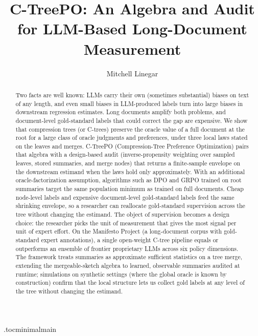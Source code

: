 \documentclass[11pt]{article}
\title{C-TreePO: An Algebra and Audit for LLM-Based Long-Document Measurement}
\author{Mitchell Linegar}
\date{}
\begin{document}
\maketitle

\begin{abstract}
Two facts are well known: LLMs carry their own (sometimes substantial)
biases on text of any length, and even small biases in LLM-produced
labels turn into large biases in downstream regression estimates. Long
documents amplify both problems, and document-level gold-standard
labels that could correct the gap are expensive. We show that compression trees (or C-trees) preserve the oracle value
of a full document at the root for a large class of oracle judgments
and preferences, under three local laws stated on the leaves and
merges. C-TreePO (Compression-Tree Preference Optimization) pairs that
algebra with a design-based audit
(inverse-propensity weighting over sampled leaves, stored summaries,
and merge nodes) that returns a finite-sample envelope on the
downstream estimand when the laws hold only approximately. With an
additional oracle-factorization assumption, algorithms such as DPO and
GRPO trained on root summaries target the same population minimum as
trained on full documents. Cheap node-level labels and expensive document-level
gold-standard labels feed the same shrinking envelope, so a
researcher can reallocate gold-standard supervision across the tree
without changing the estimand. The object of supervision becomes a design choice: the
researcher picks the unit of measurement that gives the most signal
per unit of expert effort. On the Manifesto Project (a long-document corpus with
gold-standard expert annotations), a single open-weight C-tree pipeline
equals or outperforms an ensemble of frontier proprietary LLMs
\citep{BenoitEtAl2025} across six policy dimensions. The framework treats summaries as approximate
sufficient statistics on a tree merge, extending the mergeable-sketch
algebra \citep{Agarwal2013MergeableTODS,HehirTingCormode2023SFM} to
learned, observable summaries audited at runtime; simulations on
synthetic settings (where the global oracle is known by construction)
confirm that the local structure lets us collect gold labels at any
level of the tree without changing the estimand.
\end{abstract}

\tableofcontents
\clearpage

\etocdepthtag.toc{minimalmain}








\end{document}
